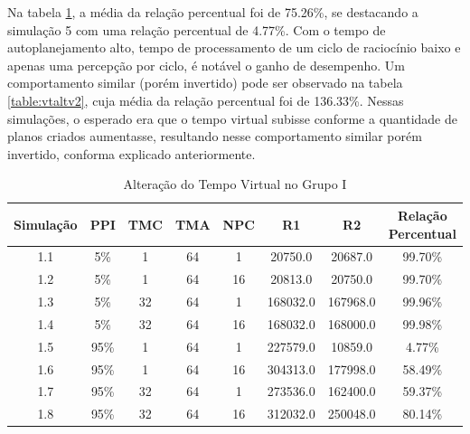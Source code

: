 Na tabela \ref{table:vtaltv1}, a média da relação percentual foi de 75.26\%, se destacando a simulação 5 com uma relação percentual de 4.77\%. Com o tempo de autoplanejamento alto, tempo de processamento de um ciclo de raciocínio baixo e apenas uma percepção por ciclo, é notável o ganho de desempenho. Um comportamento similar (porém invertido) pode ser observado na tabela \ref{table:vtaltv2}, cuja média da relação percentual foi de 136.33\%. Nessas simulações, o esperado era que o tempo virtual subisse conforme a quantidade de planos criados aumentasse, resultando nesse comportamento similar porém invertido, conforma explicado anteriormente. 

\begin{table}
    \begin{center}
        \caption{ Alteração do Tempo Virtual no Grupo I }
        \label{table:vtaltv1}
        \begin{tabular}{ |c|c|c|c|c|c|c|c| }
            \hline
            \textbf{Simulação} & \textbf{PPI} & \textbf{TMC} & \textbf{TMA} & \textbf{NPC} & \textbf{R1} & \textbf{R2} & \textbf{Relação Percentual}\\
            \hline
            1.1 & 5\% & 1 & 64 & 1 & 20750.0 & 20687.0 & 99.70\%\\
            \hline
            1.2 & 5\% & 1 & 64 & 16 & 20813.0 & 20750.0 & 99.70\%\\
            \hline
            1.3 & 5\% & 32 & 64 & 1 & 168032.0 & 167968.0 & 99.96\%\\
            \hline
            1.4 & 5\% & 32 & 64 & 16 & 168032.0 & 168000.0 & 99.98\%\\
            \hline
            1.5 & 95\% & 1 & 64 & 1 & 227579.0 & 10859.0 & 4.77\%\\
            \hline
            1.6 & 95\% & 1 & 64 & 16 & 304313.0 & 177998.0 & 58.49\%\\
            \hline
            1.7 & 95\% & 32 & 64 & 1 & 273536.0 & 162400.0 & 59.37\%\\
            \hline
            1.8 & 95\% & 32 & 64 & 16 & 312032.0 & 250048.0 & 80.14\%\\
            \hline
            
        \end{tabular}{}
    \end{center}{}
\end{table}

